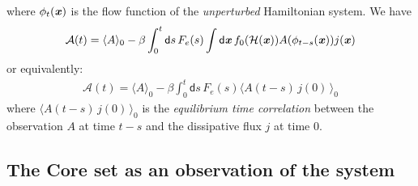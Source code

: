 \documentclass[aip,jcp,a4paper,reprint,onecolumn]{revtex4-1}
\newcommand{\vect}[1]{\textbf{\textit{#1}}}
\newcommand{\dd}{\textsf{d}}
\newcommand{\mh}{\mathcal H}
\begin{document}
where $\phi_t(\vect x)$ is the flow function of the \emph{unperturbed}
Hamiltonian system. We have
\begin{align}
  \mathcal A(t)
  =
  \langle A\rangle_0
  -
  \beta
  \int_0^t\dd s\,
  F_e(s)
  \int \dd \vect x\,
  f_0(\mh(\vect x))
  A(\phi_{t-s}(\vect x))
  j(\vect x)  
\end{align}
or equivalently:
\begin{align}
  \mathcal A(t)
  =
  \langle A\rangle_0
  -
  \beta
  \int_0^t\dd s\,
  F_e(s)
  \langle
  A(t-s)\,
  j(0)\,
  \rangle_0
\end{align}
where $\langle A(t-s)\,j(0)\,\rangle_0$ is the \emph{equilibrium time
  correlation} between the observation $A$ at time $t-s$ and the
dissipative flux $j$ at time 0.


\subsection{The Core set as an observation of the system}
\end{document}
